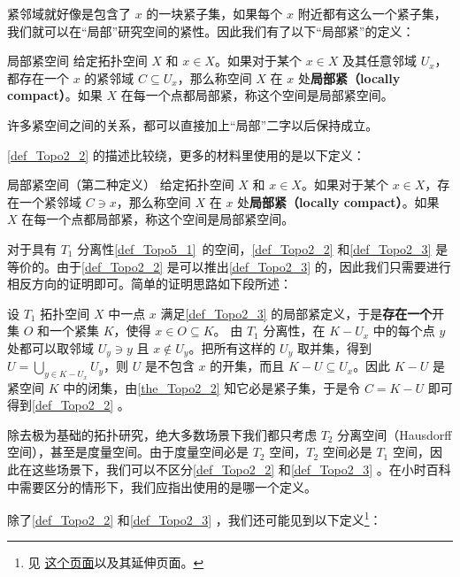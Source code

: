 紧邻域就好像是包含了 $x$ 的一块紧子集，如果每个 $x$ 附近都有这么一个紧子集，我们就可以在“局部”研究空间的紧性。因此我们有了以下“局部紧”的定义：

\begin{definition}{局部紧空间}\label{def_Topo2_2}
给定拓扑空间 $X$ 和 $x\in X$。如果对于某个 $x\in X$ 及其任意邻域 $U_x$，都存在一个 $x$ 的紧邻域 $C\subseteq U_x$，那么称空间 $X$ 在 $x$ 处\textbf{局部紧（locally compact）}。如果 $X$ 在每一个点都局部紧，称这个空间是局部紧空间。
\end{definition}

许多紧空间之间的关系，都可以直接加上“局部”二字以后保持成立。

\autoref{def_Topo2_2} 的描述比较绕，更多的材料里使用的是以下定义：

\begin{definition}{局部紧空间（第二种定义）}\label{def_Topo2_3}
给定拓扑空间 $X$ 和 $x\in X$。如果对于某个 $x\in X$，存在一个紧邻域 $C\ni x$，那么称空间 $X$ 在 $x$ 处\textbf{局部紧（locally compact）}。如果 $X$ 在每一个点都局部紧，称这个空间是局部紧空间。
\end{definition}

对于具有 $T_1$ 分离性\autoref{def_Topo5_1}~的空间，\autoref{def_Topo2_2} 和\autoref{def_Topo2_3} 是等价的。由于\autoref{def_Topo2_2} 是可以推出\autoref{def_Topo2_3} 的，因此我们只需要进行相反方向的证明即可。简单的证明思路如下段所述：

设 $T_1$ 拓扑空间 $X$ 中一点 $x$ 满足\autoref{def_Topo2_3} 的局部紧定义，于是\textbf{存在一个}开集 $O$ 和一个紧集 $K$，使得 $x\in O\subseteq K$。
由 $T_1$ 分离性，在 $K-U_x$ 中的每个点 $y$ 处都可以取邻域 $U_y\ni y$ 且 $x\not\in U_y$。把所有这样的 $U_y$ 取并集，得到 $U=\bigcup\limits_{y\in K-U_x}U_y$，则 $U$ 是不包含 $x$ 的开集，而且 $K-U\subseteq U_x$。因此 $K-U$ 是紧空间 $K$ 中的闭集，由\autoref{the_Topo2_2} 知它必是紧子集，于是令 $C=K-U$ 即可得到\autoref{def_Topo2_2} 。

除去极为基础的拓扑研究，绝大多数场景下我们都只考虑 $T_2$ 分离空间（Hausdorff空间），甚至是度量空间。由于度量空间必是 $T_2$ 空间，$T_2$ 空间必是 $T_1$ 空间，因此在这些场景下，我们可以不区分\autoref{def_Topo2_2} 和\autoref{def_Topo2_3} 。在小时百科中需要区分的情形下，我们应指出使用的是哪一个定义。

除了\autoref{def_Topo2_2} 和\autoref{def_Topo2_3} ，我们还可能见到以下定义\footnote{见 \href{https://proofwiki.org/wiki/Strongly_Locally_Compact_Space_is_Weakly_Locally_Compact}{这个页面}以及其延伸页面。}：

